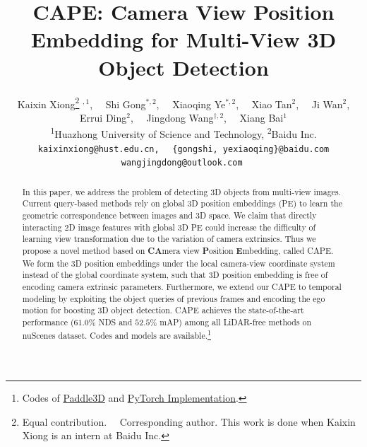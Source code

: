 \documentclass[10pt,twocolumn,letterpaper]{article}
\newcommand{\highNDS}{$61.0\%$}
\newcommand{\highmAP}{$52.5\%$}
\begin{document}
\title{CAPE: Camera View Position Embedding for Multi-View 3D Object Detection}



\author{
Kaixin Xiong\thanks{Equal contribution. ~~\textsuperscript{\dag}Corresponding author. This work is done when Kaixin Xiong is an intern at Baidu Inc. } $  ^{,1}$, \ \  
Shi Gong$^{*,2}$, \ \  
Xiaoqing Ye$^{*,2}$, \ \  
Xiao Tan$^{2}$, \ \  
Ji Wan$^{2}$, \\
Errui Ding$^{2}$, \ \
Jingdong Wang$^{\dag, 2}$, \ \
Xiang Bai$^{1}$\\
\textsuperscript{1}Huazhong University of Science and Technology, 
\textsuperscript{2}Baidu Inc.\\
{\tt\small kaixinxiong@hust.edu.cn,} \ \
{\tt\small \{gongshi, yexiaoqing\}@baidu.com} \ \
{\tt\small wangjingdong@outlook.com} \ \
}
\maketitle

\begin{abstract}

In this paper, we address the problem of detecting 3D objects from multi-view images.
Current query-based methods rely on global 3D position embeddings (PE) to learn the geometric correspondence between images and 3D space.
We claim that directly interacting 2D image features with global 3D PE 
could increase the difficulty of learning view transformation due to the variation of camera extrinsics.
Thus we propose a novel method based on \textbf{CA}mera view \textbf{P}osition \textbf{E}mbedding, called CAPE.
We form the 3D position embeddings under the local camera-view coordinate system instead of the global coordinate system, such that 3D position embedding is free of encoding camera extrinsic parameters. 
Furthermore, we extend our CAPE to temporal modeling by exploiting the object queries of previous frames and encoding the ego motion for boosting $3$D object detection. CAPE achieves the state-of-the-art performance (\highNDS{} NDS and \highmAP{} mAP) among all LiDAR-free methods on nuScenes dataset.
Codes and models are available.\footnote{Codes of \href{https://github.com/PaddlePaddle/Paddle3D}{Paddle3D} and \href{https://github.com/kaixinbear/CAPE}{PyTorch Implementation}.}











\end{abstract}
\end{document}
